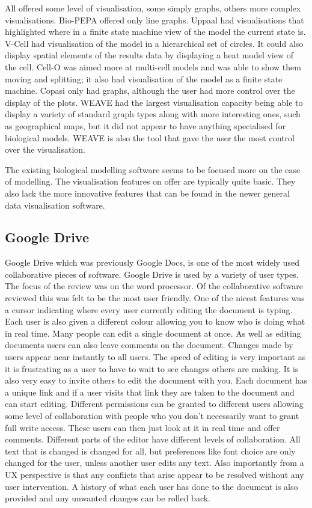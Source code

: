 All offered some level of visualisation, some simply graphs, others more complex visualisations.  Bio-PEPA offered only line graphs.  Uppaal had visualisations that highlighted where in a finite state machine view of the model the current state is.  V-Cell had visualisation of the model in a hierarchical set of circles. It could also display spatial elements of the results data by displaying a heat model view of the cell.  Cell-O was aimed more at multi-cell models and was able to show them moving and splitting; it also had visualisation of the model as a finite state machine.  Copasi only had graphs, although the user had more control over the display of the plots.  WEAVE had the largest visualisation capacity being able to display a variety of standard graph types along with more interesting ones, such as geographical maps, but it did not appear to have anything specialised for biological models.  WEAVE is also the tool that gave the user the most control over the visualisation.

The existing biological modelling software seems to be focused more on the ease of modelling.  The visualisation features on offer are typically quite basic.  They also lack the more innovative features that can be found in the newer general data visualisation software.

\subsection{Google Drive}

Google Drive which was previously Google Docs, is one of the most widely used collaborative pieces of software.  Google Drive is used by a variety of user types.  The focus of the review was on the word processor.  Of the collaborative software reviewed this was felt to be the most user friendly.  One of the nicest features was a cursor indicating where every user currently editing the document is typing. Each user is also given a different colour allowing you to know who is doing what in real time.  Many people can edit a single document at once.  As well as editing documents users can also leave comments on the document.  Changes made by users appear near instantly to all users. The speed of editing is very important as it is frustrating as a user to have to wait to see changes others are making.  It is also very easy to invite others to edit the document with you.  Each document has a unique link and if a user visits that link they are taken to the document and can start editing.  Different permissions can be granted to different users allowing some level of collaboration with people who you don't necessarily want to grant full write access. These users can then just look at it in real time and offer comments.  Different parts of the editor have different levels of collaboration.  All text that is changed is changed for all, but preferences like font choice are only changed for the user, unless another user edits any text.  Also importantly from a \ac{UX} perspective is that any conflicts that arise appear to be resolved without any user intervention.  A history of what each user has done to the document is also provided and any unwanted changes can be rolled back.


